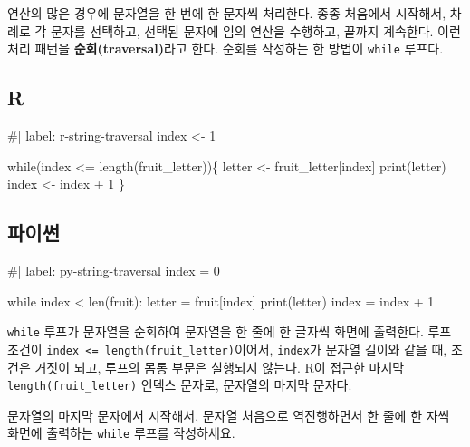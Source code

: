 \documentclass[
  letterpaper,
]{book}
\newenvironment{Shaded}{\begin{snugshade}}{\end{snugshade}}
\newcommand{\NormalTok}[1]{\textcolor[rgb]{0.00,0.23,0.31}{#1}}
\begin{document}
   

연산의 많은 경우에 문자열을 한 번에 한 문자씩 처리한다. 종종 처음에서
시작해서, 차례로 각 문자를 선택하고, 선택된 문자에 임의 연산을 수행하고,
끝까지 계속한다. 이런 처리 패턴을 \textbf{순회(traversal)}라고 한다.
순회를 작성하는 한 방법이 \texttt{while} 루프다.

\subsection{R}

\begin{Shaded}
\begin{Highlighting}[]
\NormalTok{\#| label: r{-}string{-}traversal}
\NormalTok{index \textless{}{-} 1}

\NormalTok{while(index \textless{}= length(fruit\_letter))\{}
\NormalTok{  letter \textless{}{-} fruit\_letter[index]}
\NormalTok{  print(letter)}
\NormalTok{  index \textless{}{-} index + 1}
\NormalTok{\}}
\end{Highlighting}
\end{Shaded}

\subsection{파이썬}

\begin{Shaded}
\begin{Highlighting}[]
\NormalTok{\#| label: py{-}string{-}traversal}
\NormalTok{index = 0}

\NormalTok{while index \textless{} len(fruit):}
\NormalTok{    letter = fruit[index]}
\NormalTok{    print(letter)}
\NormalTok{    index = index + 1}
\end{Highlighting}
\end{Shaded}

\texttt{while} 루프가 문자열을 순회하여 문자열을 한 줄에 한 글자씩
화면에 출력한다. 루프 조건이
\texttt{index\ \textless{}=\ length(fruit\_letter)}이어서,
\texttt{index}가 문자열 길이와 같을 때, 조건은 거짓이 되고, 루프의 몸통
부문은 실행되지 않는다. R이 접근한 마지막 \texttt{length(fruit\_letter)}
인덱스 문자로, 문자열의 마지막 문자다.

\begin{tcolorbox}[enhanced jigsaw, coltitle=black, breakable, opacityback=0, colback=white, bottomtitle=1mm, titlerule=0mm, toptitle=1mm, title=\textcolor{quarto-callout-warning-color}{\faExclamationTriangle}\hspace{0.5em}{연습문제}, left=2mm, rightrule=.15mm, colframe=quarto-callout-warning-color-frame, bottomrule=.15mm, leftrule=.75mm, toprule=.15mm, arc=.35mm, colbacktitle=quarto-callout-warning-color!10!white, opacitybacktitle=0.6]

문자열의 마지막 문자에서 시작해서, 문자열 처음으로 역진행하면서 한 줄에
한 자씩 화면에 출력하는 \texttt{while} 루프를 작성하세요.

\end{tcolorbox}
\end{document}
